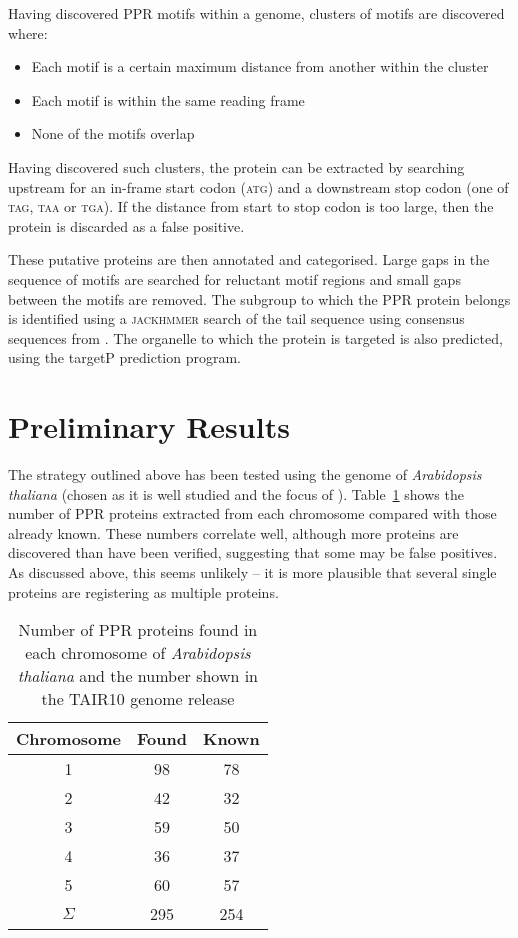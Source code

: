 \documentclass[twoside,a4paper]{article}
\begin{document}
\begin{multicols}{2}
Having discovered PPR motifs within a genome, clusters of motifs are discovered
where:
\begin{itemize}
  \item Each motif is a certain maximum distance from another within the
    cluster
  \item Each motif is within the same reading frame
  \item None of the motifs overlap
\end{itemize}
Having discovered such clusters, the protein can be extracted by searching
upstream for an in-frame start codon (\textsc{atg}) and a downstream stop codon
(one of \textsc{tag}, \textsc{taa} or \textsc{tga}).
If the distance from start to stop codon is too large, then the protein is
discarded as a false positive.

These putative proteins are then annotated and categorised.
Large gaps in the sequence of motifs are searched for reluctant motif regions
and small gaps between the motifs are removed.
The subgroup to which the PPR protein belongs is identified using a
\textsc{jackhmmer} search of the tail sequence using consensus sequences 
from \cite{Lurin2004}.
The organelle to which the protein is targeted is also predicted, using the
targetP prediction program.

\section{Preliminary Results}
\label{sec:results}

The strategy outlined above has been tested using the genome of 
\textit{Arabidopsis thaliana} (chosen as it is well studied and the focus of
\cite{Lurin2004}). 
Table~\ref{tab:CHR} shows the number of PPR proteins
extracted from each chromosome compared with those already known.
These numbers correlate well, although more proteins are discovered than have
been verified, suggesting that some may be false positives.
As discussed above, this seems unlikely -- it is more plausible that several
single proteins are registering as multiple proteins.

\begin{table}[H]
  \centering
  \begin{tabular}{c|c|c}
    Chromosome & Found & Known \\
    \hline
    1 & 98 & 78 \\
    2 & 42 & 32 \\
    3 & 59 & 50 \\
    4 & 36 & 37 \\
    5 & 60 & 57 \\
    \hline
    $\Sigma$ & 295 & 254 \\
  \end{tabular}
  \caption{Number of PPR proteins found in each chromosome of 
    \textit{Arabidopsis thaliana} and the number shown in the TAIR10 genome
    release}
  \label{tab:CHR}
\end{table}


\end{multicols}
\end{document}
